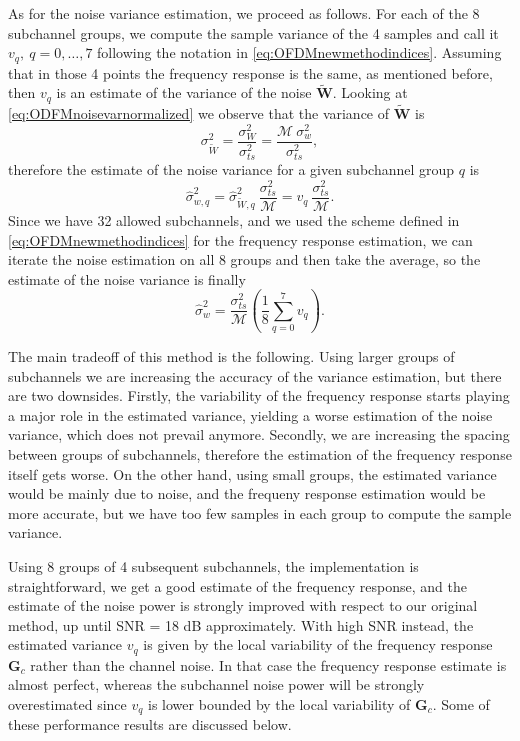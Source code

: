 \documentclass[10pt]{article}
\newcommand{\ofdM} {\mathcal{M}}
\begin{document}
As for the noise variance estimation, we proceed as follows. For each of the 8 subchannel groups, we compute the sample variance of the 4 samples and call it $v_q,\ q\!=\!0,\ldots,7$ following the notation in \eqref{eq:OFDMnewmethodindices}. Assuming that in those 4 points the frequency response is the same, as mentioned before, then $v_q$ is an estimate of the variance of the noise $\mathbf{\tilde{W}}$. Looking at \eqref{eq:ODFMnoisevarnormalized} we observe that the variance of $\mathbf{\tilde{W}}$ is
\begin{equation}
	\sigma_{\tilde{W}}^2 = \dfrac{\sigma_W^2}{\sigma_{ts}^2} = \dfrac{\ofdM \: \sigma_w^2}{\sigma_{ts}^2},
\end{equation}
therefore the estimate of the noise variance for a given subchannel group $q$ is
\begin{equation}
	\hat{\sigma}_{w,q}^2 = \hat{\sigma}_{\tilde{W}, q}^2 \: \dfrac{\sigma_{ts}^2}{\ofdM} = v_q \: \dfrac{\sigma_{ts}^2}{\ofdM}.
\end{equation}
Since we have 32 allowed subchannels, and we used the scheme defined in \eqref{eq:OFDMnewmethodindices} for the frequency response estimation, we can iterate the noise estimation on all 8 groups and then take the average, so the estimate of the noise variance is finally
\begin{equation}
	\hat{\sigma}_w^2 = \dfrac{\sigma_{ts}^2}{\ofdM} \left( \frac{1}{8} \sum_{q=0}^{7} v_q \right).
	\label{eq:noisepwrest_newmethod}
\end{equation}

The main tradeoff of this method is the following. Using larger groups of subchannels we are increasing the accuracy of the variance estimation, but there are two downsides. Firstly, the variability of the frequency response starts playing a major role in the estimated variance, yielding a worse estimation of the noise variance, which does not prevail anymore. Secondly, we are increasing the spacing between groups of subchannels, therefore the estimation of the frequency response itself gets worse. On the other hand, using small groups, the estimated variance would be mainly due to noise, and the frequeny response estimation would be more accurate, but we have too few samples in each group to compute the sample variance.

Using 8 groups of 4 subsequent subchannels, the implementation is straightforward, we get a good estimate of the frequency response, and the estimate of the noise power is strongly improved with respect to our original method, up until SNR = 18 dB approximately. With high SNR instead, the estimated variance $v_q$ is given by the local variability of the frequency response $\mathbf{G}_c$ rather than the channel noise. In that case the frequency response estimate is almost perfect, whereas the subchannel noise power will be strongly overestimated since $v_q$ is lower bounded by the local variability of $\mathbf{G}_c$. Some of these performance results are discussed below.
\end{document}
